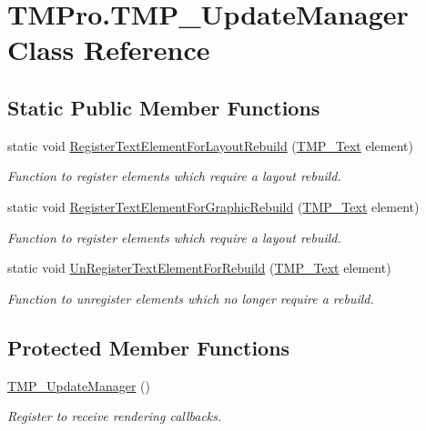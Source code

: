 \hypertarget{class_t_m_pro_1_1_t_m_p___update_manager}{}\section{T\+M\+Pro.\+T\+M\+P\+\_\+\+Update\+Manager Class Reference}
\label{class_t_m_pro_1_1_t_m_p___update_manager}
\subsection*{Static Public Member Functions}
\begin{DoxyCompactItemize}
\item 
static void \mbox{\hyperlink{class_t_m_pro_1_1_t_m_p___update_manager_a634231dcd884e950e0b9c7527bc39311}{Register\+Text\+Element\+For\+Layout\+Rebuild}} (\mbox{\hyperlink{class_t_m_pro_1_1_t_m_p___text}{T\+M\+P\+\_\+\+Text}} element)
\begin{DoxyCompactList}\small\item\em Function to register elements which require a layout rebuild. \end{DoxyCompactList}\item 
static void \mbox{\hyperlink{class_t_m_pro_1_1_t_m_p___update_manager_a110903981e6a8c00d95957b707cc3c99}{Register\+Text\+Element\+For\+Graphic\+Rebuild}} (\mbox{\hyperlink{class_t_m_pro_1_1_t_m_p___text}{T\+M\+P\+\_\+\+Text}} element)
\begin{DoxyCompactList}\small\item\em Function to register elements which require a layout rebuild. \end{DoxyCompactList}\item 
static void \mbox{\hyperlink{class_t_m_pro_1_1_t_m_p___update_manager_a230503254fd8d8ebc2ba1849ff30dad8}{Un\+Register\+Text\+Element\+For\+Rebuild}} (\mbox{\hyperlink{class_t_m_pro_1_1_t_m_p___text}{T\+M\+P\+\_\+\+Text}} element)
\begin{DoxyCompactList}\small\item\em Function to unregister elements which no longer require a rebuild. \end{DoxyCompactList}\end{DoxyCompactItemize}
\subsection*{Protected Member Functions}
\begin{DoxyCompactItemize}
\item 
\mbox{\hyperlink{class_t_m_pro_1_1_t_m_p___update_manager_aac91ee76bdd5a4fe9e77536d51a644b8}{T\+M\+P\+\_\+\+Update\+Manager}} ()
\begin{DoxyCompactList}\small\item\em Register to receive rendering callbacks. \end{DoxyCompactList}\end{DoxyCompactItemize}
